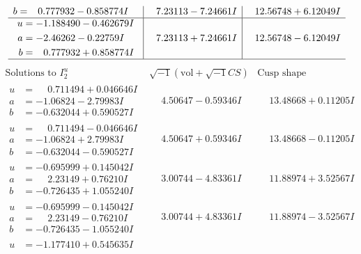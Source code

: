 \documentclass[1p]{elsarticle_modified}
\theoremstyle{definition}
\newcommand{\I}{\sqrt{-1}}
\begin{document}
$$\begin{array}{c|c|c}
\begin{aligned}
b &= \phantom{-}0.777932 - 0.858774 I\end{aligned}
 & \phantom{-}7.23113 - 7.24661 I & \phantom{-}12.56748 + 6.12049 I \\ \hline\begin{aligned}
u &= -1.188490 - 0.462679 I \\
a &= -2.46262 - 0.22759 I \\
b &= \phantom{-}0.777932 + 0.858774 I\end{aligned}
 & \phantom{-}7.23113 + 7.24661 I & \phantom{-}12.56748 - 6.12049 I\\
 \hline 
 \end{array}$$\newpage$$\begin{array}{c|c|c}  
\text{Solutions to }I^u_{2}& \I (\text{vol} + \sqrt{-1}CS) & \text{Cusp shape}\\
 \hline 
\begin{aligned}
u &= \phantom{-}0.711494 + 0.046646 I \\
a &= -1.06824 - 2.79983 I \\
b &= -0.632044 + 0.590527 I\end{aligned}
 & \phantom{-}4.50647 - 0.59346 I & \phantom{-}13.48668 + 0.11205 I \\ \hline\begin{aligned}
u &= \phantom{-}0.711494 - 0.046646 I \\
a &= -1.06824 + 2.79983 I \\
b &= -0.632044 - 0.590527 I\end{aligned}
 & \phantom{-}4.50647 + 0.59346 I & \phantom{-}13.48668 - 0.11205 I \\ \hline\begin{aligned}
u &= -0.695999 + 0.145042 I \\
a &= \phantom{-}2.23149 + 0.76210 I \\
b &= -0.726435 + 1.055240 I\end{aligned}
 & \phantom{-}3.00744 - 4.83361 I & \phantom{-}11.88974 + 3.52567 I \\ \hline\begin{aligned}
u &= -0.695999 - 0.145042 I \\
a &= \phantom{-}2.23149 - 0.76210 I \\
b &= -0.726435 - 1.055240 I\end{aligned}
 & \phantom{-}3.00744 + 4.83361 I & \phantom{-}11.88974 - 3.52567 I \\ \hline\begin{aligned}
u &= -1.177410 + 0.545635 I \\

\end{aligned}
\end{array}$$
\end{document}
